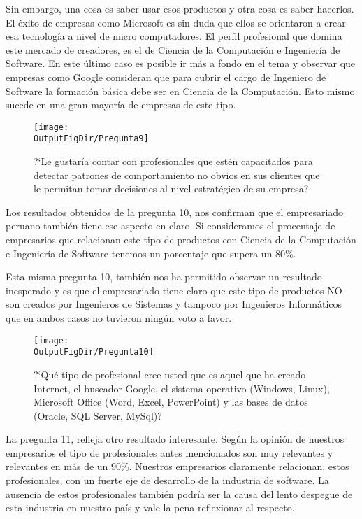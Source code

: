 Sin embargo, una cosa es saber usar esos productos y otra cosa es saber hacerlos. El éxito de empresas como Microsoft es sin duda que ellos se orientaron a crear esa tecnología a nivel de micro computadores. El perfil profesional que domina este mercado de creadores, es el de Ciencia de la Computación e Ingeniería de Software. En este último caso es posible ir más a fondo en el tema y observar que empresas como Google consideran que para cubrir el cargo de Ingeniero de Software la formación básica debe ser en Ciencia de la Computación. Esto mismo sucede en una gran mayoría de empresas de este tipo.

\begin{figure}[!h]
	\centering
	\texttt{[image: \\OutputFigDir/Pregunta9]}
	\label{fig:Preg9}
	\caption{?`Le gustaría contar con profesionales que estén capacitados para detectar patrones de comportamiento no obvios en sus clientes que le permitan tomar decisiones al nivel estratégico de su empresa?}
\end{figure}

Los resultados obtenidos de la pregunta 10, nos confirman que el empresariado peruano también tiene ese aspecto en claro. Si consideramos el procentaje de empresarios que relacionan este tipo de productos con Ciencia de la Computación e Ingeniería de Software tenemos un porcentaje que supera un 80\%.

Esta misma pregunta 10, también nos ha permitido observar un resultado inesperado y es que el empresariado tiene claro que este tipo de productos NO son creados por Ingenieros de Sistemas y tampoco por Ingenieros Informáticos que en ambos casos no tuvieron ningún voto a favor.

\begin{figure}[!h]
	\centering
	\texttt{[image: \\OutputFigDir/Pregunta10]}
	\label{fig:Preg10}
	\caption{?`Qué tipo de profesional cree usted que es aquel que ha creado Internet, el buscador Google, el sistema operativo (Windows, Linux), Microsoft Office (Word, Excel, PowerPoint) y las bases de datos (Oracle, SQL Server, MySql)?}
\end{figure}

La pregunta 11, refleja otro resultado interesante. Según la opinión de nuestros empresarios el tipo de profesionales antes mencionados son muy relevantes y relevantes en más de un 90\%. Nuestros empresarios claramente relacionan, estos profesionales, con un fuerte eje de desarrollo de la industria de software. La ausencia de estos profesionales también podría ser la causa del lento despegue de esta industria en nuestro país y vale la pena reflexionar al respecto.

